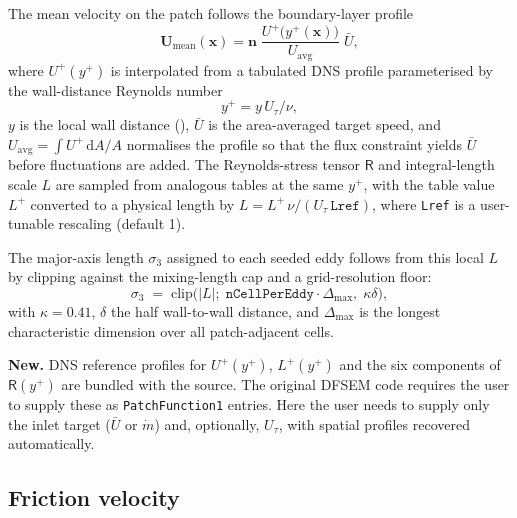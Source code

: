 \documentclass[
 amsmath,amssymb,
 aps,
 twocolumn,
]{revtex4-2}
\renewcommand{\vec}[1]{\boldsymbol{#1}}
\newcommand{\dd}{\mathrm{d}}
\newcommand{\bR}{\mathsf{R}}
\newcommand{\improv}[1]{\par\medskip\noindent\textbf{#1}\hspace{0.5em}\ignorespaces}
\begin{document}
The mean velocity on the patch follows the boundary-layer profile
\begin{equation}\label{eq:Umean}
  \vec U_{\mathrm{mean}}(\vec x) = \vec n\;
  \frac{U^+\!\bigl(y^+(\vec x)\bigr)}{U_{\mathrm{avg}}}\;\bar U,
\end{equation}
where $U^+(y^+)$ is interpolated from a tabulated DNS profile
parameterised by the wall-distance Reynolds number
\begin{equation}\label{eq:yplus}
  y^+ = y\,U_\tau/\nu,
\end{equation}
$y$ is the local wall distance (), $\bar U$ is the
area-averaged target speed, and $U_{\mathrm{avg}}=\int U^+\,\dd A/A$
normalises the profile so that the flux constraint yields $\bar U$
before fluctuations are added. The Reynolds-stress tensor $\bR$ and
integral-length scale $L$ are sampled from analogous tables at the same
$y^+$, with the table value $L^+$ converted to a physical length by
$L = L^+\,\nu/(U_\tau\,\mathtt{Lref})$, where \texttt{Lref} is a
user-tunable rescaling (default 1).

The major-axis length $\sigma_3$ assigned to each seeded eddy follows
from this local $L$ by clipping against the mixing-length cap and a
grid-resolution floor:
\begin{equation}\label{eq:sigma3}
  \sigma_3 \;=\; \mathrm{clip}\bigl(|L|;\;
    \texttt{nCellPerEddy}\cdot\Delta_{\max},\;\kappa\delta\bigr),
\end{equation}
with $\kappa=0.41$, $\delta$ the half wall-to-wall distance, and
$\Delta_{\max}$ is the longest characteristic dimension over all patch-adjacent cells.

\improv{New.}
DNS reference profiles for $U^+(y^+)$, $L^+(y^+)$ and the six components of
$\bR(y^+)$ are bundled with the source. The original DFSEM code requires the
user to supply these as \texttt{PatchFunction1} entries.
Here the user
needs to supply only the inlet target ($\bar U$ or $\dot m$) and,
optionally, $U_\tau$, with spatial profiles recovered automatically.

\subsection{Friction velocity}\label{sec:Utau}
\end{document}
